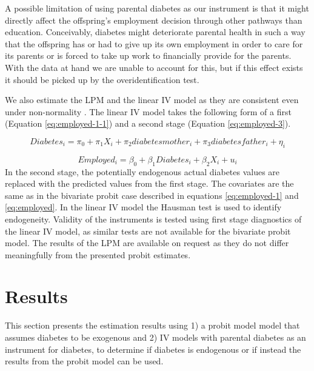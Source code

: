 A possible limitation of using parental diabetes as our
instrument is that it might directly affect the offspring's employment
decision through other pathways than education. Conceivably, diabetes
might deteriorate parental health in such a way that the offspring
has or had to give up its own employment in order to care for its
parents or is forced to take up work to financially provide for the
parents. With the data at hand we are unable to account for this,
but if this effect exists it should be picked up by the overidentification
test. 

We also estimate the \ac{LPM} and the linear \ac{IV} model
as they are consistent even under non-normality \parencite{Angrist2009a}.
The linear \ac{IV} model takes the following form of a first (Equation
\ref{eq:employed-1-1}) and a second stage (Equation \ref{eq:employed-3}).


\begin{equation}
Diabetes_{i}=\pi_{0}+\pi_{1}X_{i}+\pi_{2}diabetesmother_{i}+\pi_{3}diabetesfather_{i}+\eta_{i}\label{eq:employed-1-1}
\end{equation}



\begin{equation}
Employed_{i}=\beta_{0}+\beta_{1}Diabetes_{i}+\beta_{2}X_{i}+u_{i}\label{eq:employed-3}
\end{equation}
In the second stage, the potentially endogenous actual diabetes values
are replaced with the predicted values from the first stage. The covariates
are the same as in the bivariate probit case described in equations
\ref{eq:employed-1} and \ref{eq:employed}. In the linear \ac{IV}
model the Hausman test is used to identify endogeneity. Validity of
the instruments is tested using first stage diagnostics of the linear
\ac{IV} model, as similar tests are not available for the bivariate
probit model. The results of the \ac{LPM} are available on request
as they do not differ meaningfully from the presented probit estimates. 


\section{\label{sec:RESULTS}Results}

This section presents the estimation results using 1) a
probit model model that assumes diabetes to be exogenous and 2) \ac{IV}
models with parental diabetes as an instrument for diabetes, to determine
if diabetes is endogenous or if instead the results from the probit
model can be used. 


